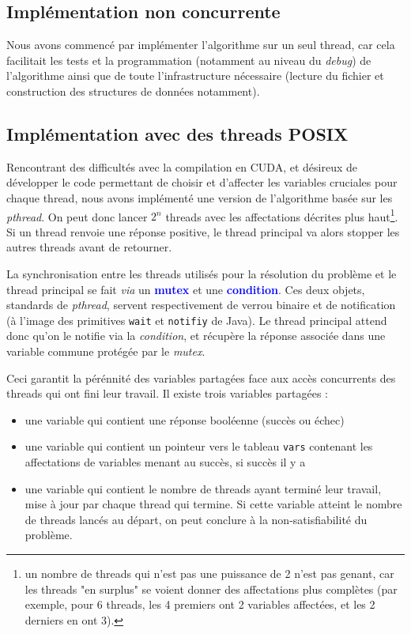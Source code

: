 \documentclass{article}
\newcommand{\keyword}[1]{\textbf{\textcolor{blue}{#1}}}
\newcommand{\code}[1]{\texttt{{#1}}}
\newcommand{\cuda}{\textsc{CUDA}}
\begin{document}
\subsection{Implémentation non concurrente}
    Nous avons commencé par implémenter l'algorithme sur un seul thread, car cela facilitait les tests et la programmation (notamment au niveau du \emph{debug}) de l'algorithme ainsi que de toute l'infrastructure nécessaire (lecture du fichier et construction des structures de données notamment). 

\subsection{Implémentation avec des threads \textsc{POSIX}}
Rencontrant des difficultés avec la compilation en \cuda, et désireux de développer le code permettant de choisir et d'affecter les variables \og cruciales \fg pour chaque thread, nous avons implémenté une version de l'algorithme basée sur les \emph{pthread}. On peut donc lancer $2^{n}$ threads avec les affectations décrites plus haut\footnote{un nombre de threads qui n'est pas une puissance de 2 n'est pas genant, car les threads "en surplus" se voient donner des affectations plus complètes (par exemple, pour 6 threads, les 4 premiers ont 2 variables affectées, et les 2 derniers en ont 3).}. Si un thread renvoie une réponse positive, le thread principal va alors stopper les autres threads avant de retourner.

La synchronisation entre les threads utilisés pour la résolution du problème et le thread principal se fait \emph{via} un \keyword{mutex} et une \keyword{condition}. Ces deux objets, standards de \emph{pthread}, servent respectivement de verrou binaire et de notification (à l'image des primitives \code{wait} et \code{notifiy} de Java). Le thread principal attend donc qu'on le notifie via la \emph{condition}, et récupère la réponse associée dans une variable commune protégée par le \emph{mutex}. 

Ceci garantit la pérénnité des variables partagées face aux accès concurrents des threads qui ont fini leur travail. Il existe trois variables partagées :
\begin{itemize}
      \item une variable qui contient une réponse booléenne (succès ou échec)
      \item une variable qui contient un pointeur vers le tableau \code{vars} contenant les affectations de variables menant au succès, si succès il y a
      \item une variable qui contient le nombre de threads ayant terminé leur travail, mise à jour par chaque thread qui termine. Si cette variable atteint le nombre de threads lancés au départ, on peut conclure à la non-satisfiabilité du problème.
\end{itemize}
\end{document}
